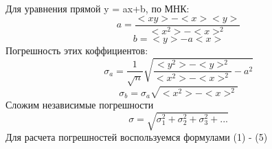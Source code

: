 \documentclass[a4paper,14pt]{extarticle}
\begin{document}
		Для уравнения прямой y = ax+b, по МНК:\\
		\begin{equation}
			a = \frac{<xy> - <x><y>}{<x^2>-<x>^2}	
		\end{equation} 
		\begin{equation}
			b = <y>-a<x>
		\end{equation}
		Погрешность этих коффициентов:
		\begin{equation}
			\sigma_a= \frac{1}{\sqrt{n}} \sqrt{\frac{<y^2>-<y>^2}{<x^2>-<x>^2}-a^2}
		\end{equation}
		\begin{equation}
			\sigma_b=\sigma_a\sqrt{<x^2>-<x>^2}
		\end{equation}
		Сложим независимые погрешности
		\begin{equation}
			\sigma = \sqrt{\sigma_1^2+\sigma_2^2+\sigma_3^2+...}
		\end{equation}
		Для расчета погрешностей воспользуемся формулами (1) - (5)
		 
\end{document}
